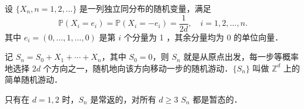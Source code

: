 
设 $\{X_n,n=1,2,\ldots\}$ 是一列独立同分布的随机变量，满足
$$\mathbb{P}(X_i=e_i)=\mathbb{P}(X_i=-e_i)=\frac{1}{2d},\quad i=1,2,\ldots,n.$$
其中 $e_i=(0,\ldots,1,\ldots,0)$ 是第 $i$ 个分量为 1 ，其余分量均为 0 的单位向量．

记 $S_n=S_0+X_1+\cdots+X_n$，其中 $S_0=0$，则 $S_n$ 就是从原点出发，每一步等概率地选择 $2d$ 个方向之一，随机地向该方向移动一步的随机游动．$\{S_n\}$ 叫做 $\mathbb{Z}^d$ 上的简单随机游动．

只有在 $d=1,2$ 时，$S_n$ 是常返的，对所有 $d\geq3$ $S_n$ 都是暂态的．